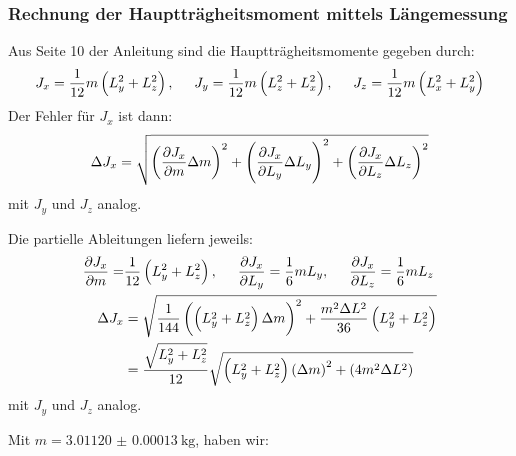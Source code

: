         \subsubsection{Rechnung der Hauptträgheitsmoment mittels Längemessung}
            Aus Seite 10 der Anleitung sind die Hauptträgheitsmomente gegeben durch:
            \begin{equation}
                J_x = \frac{1}{12}m\left(L_y^2 + L_z^2\right),\hspace{0.5cm}
                J_y = \frac{1}{12}m\left(L_z^2 + L_x^2\right),\hspace{0.5cm}
                J_z = \frac{1}{12}m\left(L_x^2 + L_y^2\right)
            \end{equation}
            Der Fehler für $J_x$ ist dann:
            \begin{align}
                \Delta J_x = \gausserror{J_x}{m, L_y, L_z}
            \end{align}
            mit $J_y$ und $J_z$ analog. 

            Die partielle Ableitungen liefern jeweils:
            \begin{align}
                \pdv{J_x}{m} = &\frac{1}{12}\left(L_y^2 + L_z^2\right),\hspace{0.5cm}
                \pdv{J_x}{L_y} = \frac{1}{6}mL_y,\hspace{0.5cm}
                \pdv{J_x}{L_z} = \frac{1}{6}mL_z \\
                \Delta J_x &= \sqrt{\frac{1}{144}\left(\left(L_y^2 + L_z^2\right) \Delta m\right)^2 + \frac{m^2\Delta L^2}{36}\left(L_y^2 + L_z^2\right)} \notag \\
                &= \frac{\sqrt{L_y^2 + L_z^2}}{12}\sqrt{\left(L_y^2 + L_z^2\right)\left(\Delta m\right)^2 + \left(4m^2\Delta L^2\right)}
            \end{align}
            mit $J_y$ und $J_z$ analog. 

            Mit $m = \SI{3.01120(13)}{\kilo\gram}$, haben wir:

